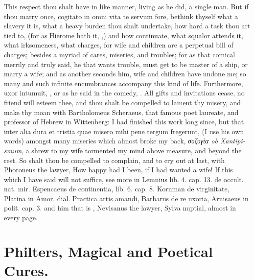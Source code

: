 This respect thou shalt have in like manner, living as he did, a single
man. But if thou marry once, cogitato in omni vita te servum
fore, bethink thyself what a slavery it is, what a heavy burden thou
shalt undertake, how hard a task thou art tied to, (for as Hierome hath
it, ,) and how
continuate, what squalor attends it, what irksomeness, what charges,
for wife and children are a perpetual bill of charges; besides a myriad
of cares, miseries, and troubles; for as that comical \Plautus{} merrily
and truly said, he that wants trouble, must get to be master of a ship,
or marry a wife; and as another seconds him, wife and children have
undone me; so many and such infinite encumbrances accompany this kind
of life. Furthermore, uxor intumuit, \etc{}, or as he said in the comedy,
. All gifts and
invitations cease, no friend will esteem thee, and thou shalt be compelled to
lament thy misery, and make thy moan with Bartholomeus
Scheraeus, that famous poet laureate, and professor of Hebrew
in Wittenberg: I had finished this work long since, but that
inter alia dura et tristia quae misero mihi pene tergum fregerunt, (I
use his own words) amongst many miseries which almost broke my back,
\emph{\textgreek{συζυγία} \textlatin{ob Xantipismum}}, a shrew to my wife tormented my mind above
measure, and beyond the rest. So shalt thou be compelled to complain,
and to cry out at last, with Phoroneus the lawyer, How happy had
I been, if I had wanted a wife! If this which I have said will not
suffice, see more in Lemnius lib. 4. cap. 13. de occult. nat. mir.
Espencaeus de continentia, lib. 6. cap. 8. Kornman de virginitate,
Platina in Amor. dial. Practica artis amandi, Barbarus de re uxoria,
Arnisaeus in polit. cap. 3. and him that is , Nevisanus
the lawyer, Sylva nuptial, almost in every page.

\section{Philters, Magical and Poetical Cures.}

